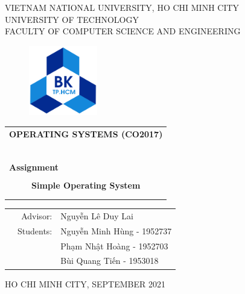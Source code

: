 \documentclass[a4paper]{article}
\begin{document}
\begin{titlepage}
\begin{center}
VIETNAM NATIONAL UNIVERSITY, HO CHI MINH CITY \\
UNIVERSITY OF TECHNOLOGY \\
FACULTY OF COMPUTER SCIENCE AND ENGINEERING
\end{center}

\vspace{1cm}

\begin{figure}[h!]
\begin{center}
\includegraphics[width=3cm]{hcmut.png}
\end{center}
\end{figure}

\vspace{1cm}


\begin{center}
\begin{tabular}{c}
\multicolumn{1}{l}{\textbf{{\Large OPERATING SYSTEMS (CO2017)}}}\\
~~\\
\hline
\\
\multicolumn{1}{l}{\textbf{{\Large Assignment}}}\\
\\
\textbf{{\Huge Simple Operating System}}\\
\\

\\
\hline
\end{tabular}
\end{center}

\vspace{3cm}

\begin{table}[h]
\begin{tabular}{rrl}
\hspace{5 cm} & Advisor: & Nguyễn Lê Duy Lai\\
& Students: & Nguyễn Minh Hùng - 1952737 \\
& & Phạm Nhật Hoàng - 1952703 \\
& & Bùi Quang Tiến - 1953018
 \\
\end{tabular}
\end{table}

\begin{center}
{\footnotesize HO CHI MINH CITY, SEPTEMBER 2021}
\end{center}
\end{titlepage}
\end{document}
